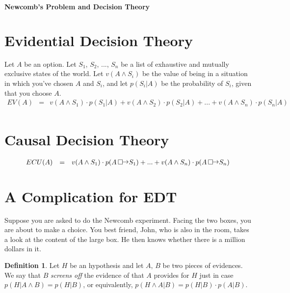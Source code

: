 \documentclass[12pt]{article}
\newcommand{\counterfactual}{\ensuremath{%
  \Box\kern-1.5pt
  \raise1pt\hbox{$\mathord{\rightarrow}$}}}
\theoremstyle{definition}
\newtheorem{defin}[theo]{Definition}
\begin{document}


\begin{center}
{\Large \bf Newcomb's Problem and Decision Theory}
\end{center}

\smallskip

\section{Evidential Decision Theory}

Let $A$ be an option. Let $S_1$, $S_2$, $...$, $S_n$ be a list of exhaustive and mutually exclusive states of the world. Let $v(A \land S_i)$ be the value of being in a situation in which you’ve chosen $A$ and $S_i$, and let $p(S_i|A)$ be the probability of $S_i$, given that you choose $A$.
\[
\begin{array}{ccc}
EV(A) &= &v(A \land S_1) \cdot p(S_1|A) + v(A \land S_2) \cdot p(S_2|A)+... +v(A \land S_n) \cdot p(S_n|A)\\
\end{array}
\]

\section{Causal Decision Theory}
\[
\begin{array}{ccc}
ECU(A) &= &v(A \land S_1) \cdot p(A \, \counterfactual S_1) +... +v(A \land S_n) \cdot p(A \, \counterfactual S_n)\\
\end{array}
\]

\section{A Complication for EDT}

Suppose you are asked to do the Newcomb experiment. Facing the two boxes, you are about to make a choice. You best friend, John, who is also in the room, takes a look at the content of the large box. He then knows whether there is a million dollars in it.


\begin{defin}
Let $H$ be an hypothesis and let $A$, $B$ be two pieces of evidences. We say that $B$ \textit{screens off} the evidence of that $A$ provides for $H$ just in case $p(H | A \land B) = p(H | B)$, or equivalently, $p(H \land A|B) = p(H|B) \cdot p(A|B)$.
\end{defin}
\end{document}
